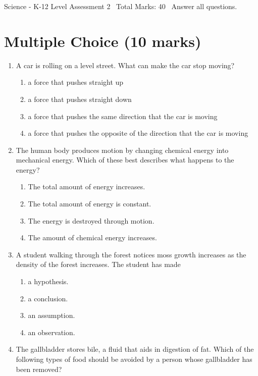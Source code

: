 \documentclass[12pt]{article}
\begin{document}
\begin{center}
Science - K-12 Level Assessment 2 \
Total Marks: 40 \
Answer all questions.
\end{center}

\section*{Multiple Choice (10 marks)}
\begin{enumerate}[label=\arabic*.]
\item A car is rolling on a level street. What can make the car stop moving?
\begin{enumerate}[label=(\alph*)]
    \item a force that pushes straight up
    \item a force that pushes straight down
    \item a force that pushes the same direction that the car is moving
    \item a force that pushes the opposite of the direction that the car is moving
\end{enumerate}
\item The human body produces motion by changing chemical energy into mechanical energy. Which of these best describes what happens to the energy?
\begin{enumerate}[label=(\alph*)]
    \item The total amount of energy increases.
    \item The total amount of energy is constant.
    \item The energy is destroyed through motion.
    \item The amount of chemical energy increases.
\end{enumerate}
\item A student walking through the forest notices moss growth increases as the density of the forest increases. The student has made
\begin{enumerate}[label=(\alph*)]
    \item a hypothesis.
    \item a conclusion.
    \item an assumption.
    \item an observation.
\end{enumerate}
\item The gallbladder stores bile, a fluid that aids in digestion of fat. Which of the following types of food should be avoided by a person whose gallbladder has been removed?

\end{enumerate}
\end{document}
